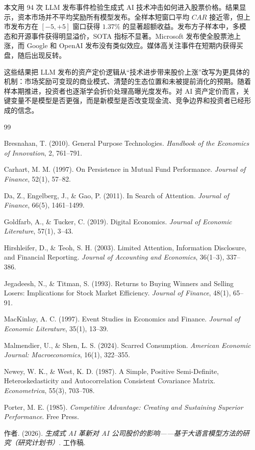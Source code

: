 \documentclass[11pt,fontset=fandol]{ctexart}
\begin{document}
本文用 94 次 LLM 发布事件检验生成式 AI 技术冲击如何进入股票价格。结果显示，资本市场并不平均奖励所有模型发布。全样本短窗口平均 $CAR$ 接近零，但上市发布方在 $[-5,+5]$ 窗口获得 $1.37\%$ 的显著超额收益。发布方子样本中，多模态和开源事件获得明显溢价，SOTA 指标不显著。Microsoft 发布使全股票池上涨，而 Google 和 OpenAI 发布没有类似效应。媒体高关注事件在短期内获得买盘，随后出现反转。

这些结果把 LLM 发布的资产定价逻辑从“技术进步带来股价上涨”改写为更具体的机制：市场奖励可变现的商业模式、清楚的生态位置和未被提前消化的预期。随着样本期推进，投资者也逐渐学会折价处理高曝光度发布。对 AI 资产定价而言，关键变量不是模型是否更强，而是新模型是否改变现金流、竞争边界和投资者已经形成的信念。

\begin{thebibliography}{99}
\small

Bresnahan, T. (2010). General Purpose Technologies. \emph{Handbook of the Economics of Innovation}, 2, 761--791.

Carhart, M. M. (1997). On Persistence in Mutual Fund Performance. \emph{Journal of Finance}, 52(1), 57--82.

Da, Z., Engelberg, J., \& Gao, P. (2011). In Search of Attention. \emph{Journal of Finance}, 66(5), 1461--1499.

Goldfarb, A., \& Tucker, C. (2019). Digital Economics. \emph{Journal of Economic Literature}, 57(1), 3--43.

Hirshleifer, D., \& Teoh, S. H. (2003). Limited Attention, Information Disclosure, and Financial Reporting. \emph{Journal of Accounting and Economics}, 36(1--3), 337--386.

Jegadeesh, N., \& Titman, S. (1993). Returns to Buying Winners and Selling Losers: Implications for Stock Market Efficiency. \emph{Journal of Finance}, 48(1), 65--91.

MacKinlay, A. C. (1997). Event Studies in Economics and Finance. \emph{Journal of Economic Literature}, 35(1), 13--39.

Malmendier, U., \& Shen, L. S. (2024). Scarred Consumption. \emph{American Economic Journal: Macroeconomics}, 16(1), 322--355.

Newey, W. K., \& West, K. D. (1987). A Simple, Positive Semi-Definite, Heteroskedasticity and Autocorrelation Consistent Covariance Matrix. \emph{Econometrica}, 55(3), 703--708.

Porter, M. E. (1985). \emph{Competitive Advantage: Creating and Sustaining Superior Performance}. Free Press.

作者. (2026). \emph{生成式 AI 革新对 AI 公司股价的影响——基于大语言模型方法的研究（研究计划书）}. 工作稿.

\end{thebibliography}
\end{document}
